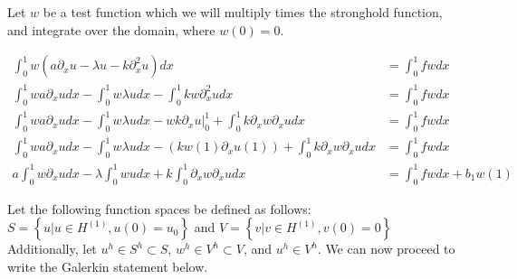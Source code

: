 \begin{solution}
Let $w$ be a test function which we will multiply times the stronghold function, and integrate over the domain, where $w(0) = 0$.

\begin{align}
\int_0^{1} w(a \partial_x u - \lambda u - k \partial_x^2 u)dx &= \int_0^1 fwdx\\
\int_0^{1} w a \partial_x u dx- \int_0^{1} w \lambda u dx - \int_0^{1} kw\partial_x^2 u dx &= \int_0^1 fw dx\\
\int_0^{1} w a \partial_x u dx- \int_0^{1} w \lambda u dx -wk\partial_x u \Big |_{0}^1 + \int_0^1 k \partial_x w \partial_x u dx &= \int_0^1 fw dx\\
\int_0^{1} w a \partial_x u dx- \int_0^{1} w \lambda u dx - (k w(1)\partial_x u(1)) + \int_0^1 k \partial_x w \partial_x u dx &= \int_0^1 fw dx\\
a \int_0^{1} w \partial_x u dx - \lambda\int_0^{1} w u dx + k\int_0^1 \partial_x w \partial_x u dx &= \int_0^1 fw dx + b_1 w(1)
\end{align}

Let the following function spaces be defined as follows:\\

$S = \left\{ u | u \in H^{(1)}, u(0) = u_0 \right\}$ and $V = \left\{ v | v \in H^{(1)}, v(0) = 0 \right\}$ \\

Additionally, let $u^h \in S^h \subset S$, $w^h \in V^h \subset V$, and $u^h \in V^h$. We can now proceed to write the Galerkin statement below.

\end{solution}